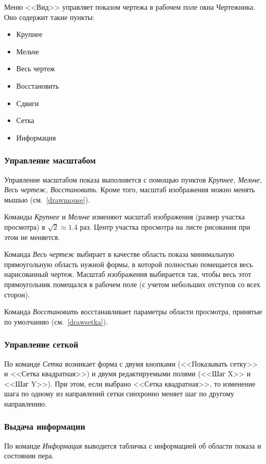 Меню <<Вид>> управляет показом чертежа в рабочем поле окна Чертежника. Оно содержит такие пункты:
\begin{itemize}
\item Крупнее 
\item Мельче
\item Весь чертеж
\item Восстановить 
\item Сдвиги 
\item Сетка
\item Информация
\end{itemize}

\subsubsection{Управление масштабом}

Управление масштабом показа выполняется с помощью пунктов \emph{Крупнее, Мельче, Весь чертеж, Восстановить}. Кроме того, масштаб изображения можно менять мышью (см.~\ref{drawmouse}).

Команды \emph{Крупнее} и \emph{Мельче} изменяют масштаб изображения (размер участка просмотра) в $\sqrt{2} \approx 1.4$ раз. Центр участка просмотра на листе рисования при этом не меняется.

Команда \emph{Весь чертеж} выбирает в качестве область показа минимальную прямоугольную область нужной формы, в которой полностью помещается весь нарисованный чертеж. Масштаб изображения выбирается так, чтобы весь этот прямоугольник помещался в рабочем поле (с учетом небольших отступов со всех сторон). 

Команда \emph{Восстановить} восстанавливает параметры области просмотра, принятые по умолчанию (см.~\ref{drawsetka}).

\subsubsection{Управление сеткой}

По команде \emph{Сетка} возникает форма с двумя кнопками (<<Показывать сетку>> и <<Сетка квадратная>>) и двумя редактируемыми полями (<<Шаг X>> и <<Шаг Y>>). При этом, если выбрано <<Сетка квадратная>>, то изменение шага по одному из направлений сетки синхронно меняет шаг по другому направлению.

\subsubsection{Выдача информации}
По команде \emph{Информация} выводится табличка с информацией об области показа и состоянии пера.


